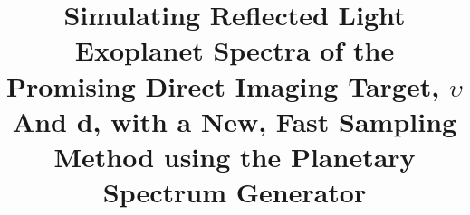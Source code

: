 \documentclass[12pt, letterpaper]{aastex631}
\begin{document}
\title{Simulating Reflected Light Exoplanet Spectra of the Promising Direct Imaging Target, $\upsilon$ And d, with a New, Fast Sampling Method using the Planetary Spectrum Generator}


\end{document}
